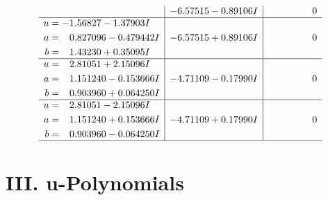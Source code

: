 \documentclass[1p]{elsarticle_modified}
\theoremstyle{definition}
\begin{document}
$$\begin{array}{c|c|c}
 & -6.57515 - 0.89106 I & \phantom{-0.000000 } 0 \\ \hline\begin{aligned}
u &= -1.56827 - 1.37903 I \\
a &= \phantom{-}0.827096 - 0.479442 I \\
b &= \phantom{-}1.43230 + 0.35095 I\end{aligned}
 & -6.57515 + 0.89106 I & \phantom{-0.000000 } 0 \\ \hline\begin{aligned}
u &= \phantom{-}2.81051 + 2.15096 I \\
a &= \phantom{-}1.151240 - 0.153666 I \\
b &= \phantom{-}0.903960 + 0.064250 I\end{aligned}
 & -4.71109 - 0.17990 I & \phantom{-0.000000 } 0 \\ \hline\begin{aligned}
u &= \phantom{-}2.81051 - 2.15096 I \\
a &= \phantom{-}1.151240 + 0.153666 I \\
b &= \phantom{-}0.903960 - 0.064250 I\end{aligned}
 & -4.71109 + 0.17990 I & \phantom{-0.000000 } 0\\
 \hline 
 \end{array}$$\newpage
\newpage\renewcommand{\arraystretch}{1}
\centering \section*{ III. u-Polynomials}
\end{document}
